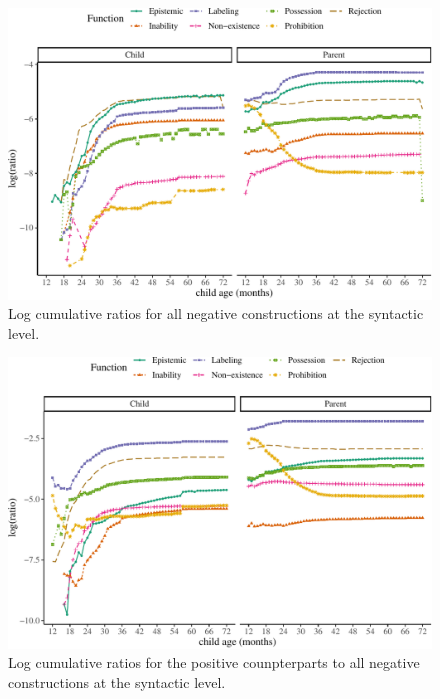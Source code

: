 \documentclass[
  english,
  man,floatsintext]{apa6}
\begin{document}
\begin{figure}[H]

{\centering \includegraphics{neg_construction_article_files/figure-latex/allneg-1} 

}

\caption{Log cumulative ratios for all negative constructions at the syntactic level.}\label{fig:allneg}
\end{figure}

\begin{figure}[H]

{\centering \includegraphics{neg_construction_article_files/figure-latex/allpos-1} 

}

\caption{Log cumulative ratios for the positive counpterparts to all negative constructions at the syntactic level.}\label{fig:allpos}
\end{figure}
\end{document}
